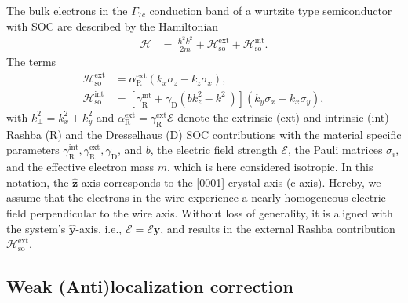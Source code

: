 \documentclass[superscriptaddress,noshowpacs,noshowkeys, twocolumn, floatfix,aps, prb,reprint]{revtex4-1}
\begin{document}
The bulk electrons in the $\Gamma_{7c}$ conduction band of a wurtzite type semiconductor with SOC are described by the Hamiltonian 
%
\begin{align}
\mathcal{H}&=\,\frac{\hbar^2k^2}{2 m}+\mathcal{H}_\text{so}^\text{ext}+\mathcal{H}_\text{so}^\text{int}.
\label{nanorodbulk}
\end{align}
%
The terms
% 
\begin{align}
\mathcal{H}_\text{so}^\text{ext}&=\alpha_\text{R}^\text{ext}(k_x\sigma_z-k_z\sigma_x),\label{rashba}\\
\mathcal{H}_\text{so}^\text{int}&=\left[\gamma_\text{R}^\text{int}+\gamma_\text{D}\left(bk_z^2-k_\perp^2\right)\right](k_y\sigma_x-k_x\sigma_y), \label{dresselhausWZ}
\end{align}
%
with $k_\perp^2=k_x^2+k_y^2$ and  $\alpha_\text{R}^\text{ext}=\gamma_\text{R}^\text{ext}\mathcal{E}$ denote the extrinsic (ext) and intrinsic (int) Rashba (R) and the Dresselhaus
(D) SOC contributions with the material specific
parameters $\gamma_\text{R}^\text{int}, \gamma_\text{R}^\text{ext}, \gamma_\text{D}$, and $b$, the
electric field strength $\mathcal{E}$, the Pauli matrices $\sigma_i$, and the
effective electron mass $m$, which is here considered isotropic. \cite{Zutic2004a,Wu2010,Gmitra2016} 
In this notation, the $\mathbf{\hat{z}}$-axis corresponds to the [0001] crystal axis (c-axis).
Hereby, we assume that the electrons in the wire experience a nearly homogeneous electric field perpendicular to the wire axis. 
Without loss of generality, it is aligned with the system's $\mathbf{\hat{y}}$-axis, i.e., $\boldsymbol{\mathcal{E}}=\mathcal{E}\mathbf{\hat{y}}$, and results in the external Rashba contribution $\mathcal{H}_\text{so}^\text{ext}$. 

\subsection{Weak (Anti)localization correction}\label{sec:WAL}
\end{document}
